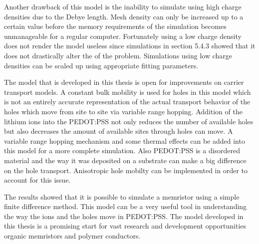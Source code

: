 \begin{doublespace}
Another drawback of this model is the inability to simulate using high charge densities due to the Debye length. Mesh density can only be increased up to a certain value before the memory requirements of the simulation becomes unmanageable for a regular computer. Fortunately using a low charge density does not render the model useless since simulations in section 5.4.3 showed that it does not drastically alter the  of the problem. Simulations using low charge densities can be scaled up using appropriate fitting parameters.  
 
The model that is developed in this thesis is open for improvements on carrier transport models. A constant bulk mobility is used for holes in this model which is not an entirely accurate representation of the actual transport behavior of the holes which move from site to site via variable range hopping. Addition of the lithium ions into the PEDOT:PSS not only reduces the number of available holes but also decreases the amount of available sites through holes can move. A variable range hopping mechanism and some thermal effects can be added into this model for a more complete simulation. Also PEDOT:PSS is a disordered material and the way it was deposited on a substrate can make a big difference on the hole transport. Anisotropic hole mobilty can be implemented in order to account for this issue.

The results showed that it is possible to simulate a memristor using a simple finite difference method. This model can be a very useful tool in understanding the way the ions and the holes move in PEDOT:PSS. The model developed in this thesis is a promising start for  vast research and development opportunities  organic memristors and  polymer conductors.

\end{doublespace}

